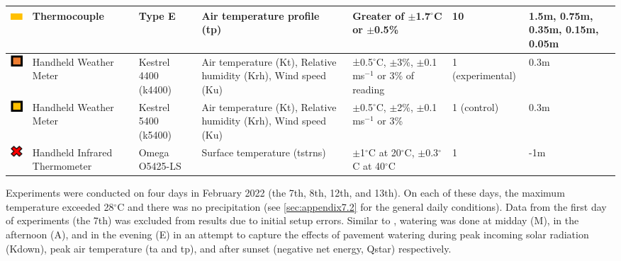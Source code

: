 \documentclass[final,3p,times,authoryear]{elsarticle}
\begin{document}
\begin{table}[!ht]
\begin{tabular}{|p{0.90cm}|p{2.0cm}|p{2.0cm}|p{3.5cm}|p{2.5cm}|p{1.0cm}|p{1.0cm}|}
\includegraphics[trim={0 0 0 0},clip,scale=0.5]{Picture6.png}&Thermocouple&Type E&Air temperature profile (\gls{tp})&Greater of $\pm$1.7$^{\circ}$C or $\pm$0.5\%&10&1.5m, 0.75m, 0.35m, 0.15m, 0.05m \\ \hline     
\includegraphics[trim={0 0 0 0},clip,scale=0.5]{Picture7.png}&Handheld Weather Meter&Kestrel 4400 (k4400)&Air temperature (\gls{Kt}), Relative humidity (\gls{Krh}), Wind speed (\gls{Ku})&±0.5$^{\circ}$C, $\pm$3\%, $\pm$0.1 ms$^{-1}$ or 3\% of reading&1 (experimental)&0.3m \\ \hline
\includegraphics[trim={0 0 0 0},clip,scale=0.5]{Picture8.png}&Handheld Weather Meter&Kestrel 5400 (k5400)&Air temperature (\gls{Kt}), Relative humidity (\gls{Krh}), Wind speed (\gls{Ku})&$\pm$0.5$^{\circ}$C, $\pm$2\%, $\pm$0.1 ms$^{-1}$ or 3\%&1 (control)&0.3m \\ \hline 
\includegraphics[trim={0 0 0 0},clip,scale=0.5]{Picture9.png}&Handheld Infrared Thermometer&Omega O5425-LS&Surface temperature (\gls{tstrns})&$\pm$1$^{\circ}$C at 20$^{\circ}$C, $\pm$0.3$^{\circ}$C at 40$^{\circ}$C&1&-1m \\ \hline           
\end{tabular}\label{table:2.1}
\end{table}



Experiments were conducted on four days in February 2022 (the 7th, 8th, 12th, and 13th). On each of these days, the maximum temperature exceeded 28$^{\circ}$C and there was no precipitation (see \ref{sec:appendix7.2} for the general daily conditions). Data from the first day of experiments (the 7th) was excluded from results due to initial setup errors. Similar to \cite{Middel2021}, watering was done at midday (M), in the afternoon (A), and in the evening (E) in an attempt to capture the effects of pavement watering during peak incoming solar radiation (\gls{Kdown}), peak air temperature (\gls{ta} and \gls{tp}), and after sunset (negative net energy, \gls{Qstar}) respectively.
\end{document}
